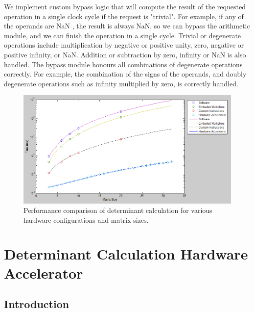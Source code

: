 \documentclass[]{article}
\begin{document}
We implement custom bypass logic that will compute the result of the requested operation in a single clock cycle if the request is "trivial". 
For example, if any of the operands are NaN \cite{ieee754}, the result is always NaN, so we can bypass the arithmetic module, and we can finish the operation in a single cycle.
Trivial or degenerate operations include multiplication by negative or positive unity, zero, negative or positive infinity, or NaN. Addition or subtraction by zero, infinity or NaN is also handled.
The bypass module honours all combinations of degenerate operations correctly. For example, the combination of the signs of the operands, and doubly degenerate operations such as infinity multiplied by zero, is correctly handled.

\begin{figure}[bp]
	\begin{center}
		\includegraphics[width = \textwidth]{detcalcperf.PNG}
	\end{center}
	\caption{Performance comparison of determinant calculation for various hardware configurations and matrix sizes.}
	\label{fig:det_calc_perf}
\end{figure}




	
\clearpage

\section{Determinant Calculation Hardware Accelerator} %
\label{sec:determinant_calculation_hardware_accelerator}

\subsection{Introduction} %
\label{sub:introduction}
\end{document}
